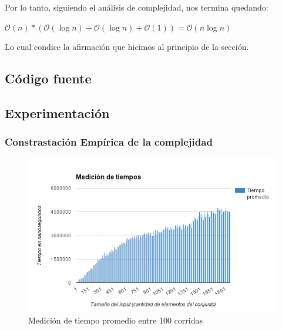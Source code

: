\noindent Por lo tanto, siguiendo el análisis de complejidad, nos termina quedando:
\begin{center}
	$\mathcal{O}(n) * (\mathcal{O}(\log{}n) + \mathcal{O}(\log{}n) + \mathcal{O}(1)) = \mathcal{O}(n\log{}n)$
\end{center}
Lo cual condice la afirmación que hicimos al principio de la sección.

\newpage
\subsection{Código fuente}





\subsection{Experimentación}

\subsubsection{Constrastación Empírica de la complejidad}
\begin{figure}[h!]
   \begin{center}
 	\includegraphics[scale=0.8]{imagenes/ej2/tiempos.png}
	\caption{Medición de tiempo promedio entre 100 corridas}
	\label{estacionesRel}
   \end{center}
 \end{figure}


